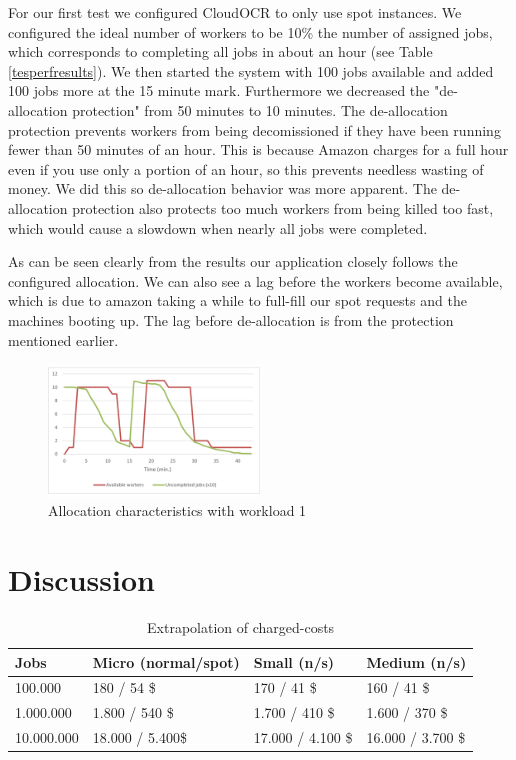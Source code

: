 \documentclass[a4paper]{IEEEtran}
\begin{document}
For our first test we configured CloudOCR to only use spot instances. We configured the ideal number of workers to be 10\% the number of assigned jobs, which corresponds to completing all jobs in about an hour (see Table \ref{tesperfresults}). We then started the system with 100 jobs available and added 100 jobs more at the 15 minute mark.
Furthermore we decreased the "de-allocation protection" from 50 minutes to 10 minutes. The de-allocation protection prevents workers from being decomissioned if they have been running fewer than 50 minutes of an hour. This is because Amazon charges for a full hour even if you use only a portion of an hour, so this prevents needless wasting of money. We did this so de-allocation behavior was more apparent. The de-allocation protection also protects too much workers from being killed too fast, which would cause a slowdown when nearly all jobs were completed.

As can be seen clearly from the results our application closely follows the configured allocation. We can also see a lag before the workers become available, which is due to amazon taking a while to full-fill our spot requests and the machines booting up. The lag before de-allocation is from the protection mentioned earlier.

\begin{figure}
\centering
\includegraphics[width=0.5\textwidth]{"results-allocation-2"}
\caption{Allocation characteristics with workload 1}
\label{fig_tesperfresults}
\end{figure}
 

\section{Discussion}

	\begin{table}
	\caption{Extrapolation of charged-costs}
	\label{extpcosts}
	\centering
	\begin{tabular}{| l | l | l | l |}
	\hline
	Jobs & Micro (normal/spot) & Small (n/s) & Medium (n/s)\\ \hline
	100.000 &  180 / 54 \$ & 170 / 41 \$ &  160 / 41 \$ \\ \hline
	1.000.000 &  1.800 / 540 \$ & 1.700 / 410 \$ &  1.600 / 370 \$ \\ \hline
	10.000.000 &  18.000 / 5.400\$ & 17.000 / 4.100 \$ & 16.000 / 3.700 \$ \\ \hline
	\end{tabular}
	\end{table}	
	
\end{document}
